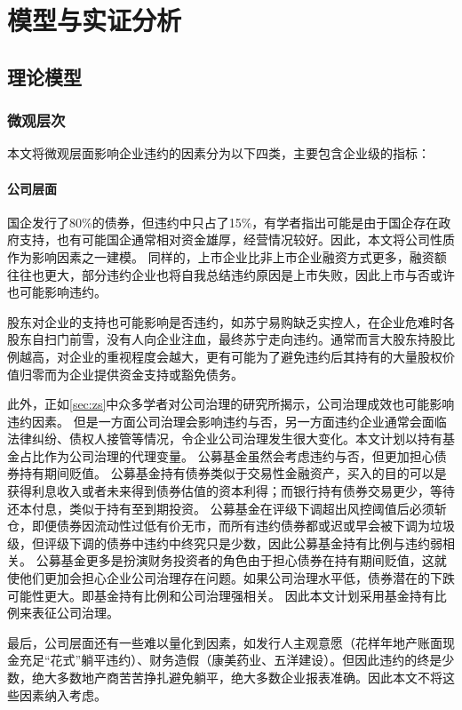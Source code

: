 
\chapter{模型与实证分析}

\section{理论模型}
\subsection{微观层次}
本文将微观层面影响企业违约的因素分为以下四类，主要包含企业级的指标：
\subsubsection{公司层面}

国企发行了80\%的债券，但违约中只占了15\%，有学者指出可能是由于国企存在政府支持\cite{mo2021china}，也有可能国企通常相对资金雄厚，经营情况较好。因此，本文将公司性质作为影响因素之一建模。
同样的，上市企业比非上市企业融资方式更多，融资额往往也更大，部分违约企业也将自我总结违约原因是上市失败，因此上市与否或许也可能影响违约。

股东对企业的支持也可能影响是否违约，如苏宁易购缺乏实控人，在企业危难时各股东自扫门前雪，没有人向企业注血，最终苏宁走向违约。通常而言大股东持股比例越高，对企业的重视程度会越大，更有可能为了避免违约后其持有的大量股权价值归零而为企业提供资金支持或豁免债务。

此外，正如\ref{sec:zs}中众多学者对公司治理的研究所揭示，公司治理成效也可能影响违约因素。
但是一方面公司治理会影响违约与否，另一方面违约企业通常会面临法律纠纷、债权人接管等情况，令企业公司治理发生很大变化。本文计划以持有基金占比作为公司治理的代理变量。
公募基金虽然会考虑违约与否，但更加担心债券持有期间贬值。
公募基金持有债券类似于交易性金融资产，买入的目的可以是获得利息收入或者未来得到债券估值的资本利得；而银行持有债券交易更少，等待还本付息，类似于持有至到期投资。
公募基金在评级下调超出风控阈值后必须斩仓，即便债券因流动性过低有价无市，而所有违约债券都或迟或早会被下调为垃圾级，但评级下调的债券中违约中终究只是少数，因此公募基金持有比例与违约弱相关。
公募基金更多是扮演财务投资者的角色由于担心债券在持有期间贬值，这就使他们更加会担心企业公司治理存在问题。如果公司治理水平低，债券潜在的下跌可能性更大\Parencite{anginer2018corporate}。即基金持有比例和公司治理强相关。
因此本文计划采用基金持有比例来表征公司治理。

最后，公司层面还有一些难以量化到因素，如发行人主观意愿（花样年地产账面现金充足“花式”躺平违约）、财务造假（康美药业、五洋建设）。但因此违约的终是少数，绝大多数地产商苦苦挣扎避免躺平，绝大多数企业报表准确。因此本文不将这些因素纳入考虑。
